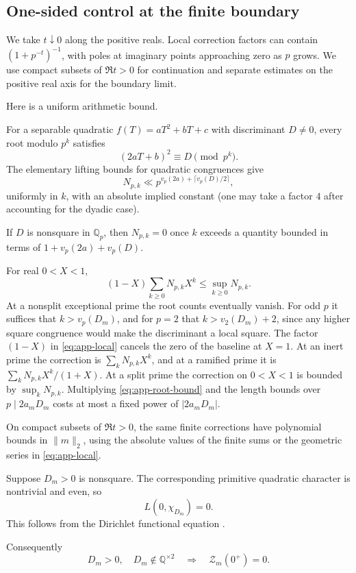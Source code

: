 \documentclass[11pt]{article}
\begin{document}
\subsection{One-sided control at the finite boundary}

We take $t\downarrow0$ along the positive reals. Local correction
factors can contain $(1+p^{-t})^{-1}$, with poles at imaginary points
approaching zero as $p$ grows. We use compact subsets of $\Re t>0$
for continuation and separate estimates on the positive real axis for
the boundary limit.

Here is a uniform arithmetic bound.

For a separable quadratic $f(T)=aT^2+bT+c$
with discriminant $D\ne0$, every root modulo
$p^k$ satisfies
\[
(2aT+b)^2\equiv D\pmod{p^k}.
\]
The elementary lifting bounds for quadratic
congruences give
\begin{equation}\label{eq:app-root-bound}
N_{p,k}\ll
p^{v_p(2a)+\lceil v_p(D)/2\rceil},
\end{equation}
uniformly in $k$, with an absolute implied
constant (one may take a factor $4$ after
accounting for the dyadic case).

If $D$ is nonsquare in $\mathbb Q_p$, then
$N_{p,k}=0$ once $k$ exceeds a quantity bounded
in terms of $1+v_p(2a)+v_p(D)$.

For real $0<X<1$,
\[
(1-X)\sum_{k\ge0}N_{p,k}X^k
\le\sup_{k\ge0}N_{p,k}.
\]
At a nonsplit exceptional prime the root counts eventually vanish.
For odd $p$ it suffices that $k>v_p(D_m)$, and for $p=2$ that
$k>v_2(D_m)+2$, since any higher square congruence would make the
discriminant a local square. The factor $(1-X)$ in
\eqref{eq:app-local} cancels the zero of the baseline at $X=1$.
At an inert prime the correction is $\sum_k N_{p,k}X^k$, and at a
ramified prime it is $\sum_k N_{p,k}X^k/(1+X)$. At a split prime
the correction on $0<X<1$ is bounded by $\sup_k N_{p,k}$.
Multiplying \eqref{eq:app-root-bound} and the length bounds over
$p\mid 2a_mD_m$ costs at most a fixed power of $|2a_mD_m|$.

On compact subsets of $\Re t>0$, the same finite corrections have
polynomial bounds in $\|m\|_2$, using the absolute values of the finite
sums or the geometric series in \eqref{eq:app-local}.

Suppose $D_m>0$ is nonsquare. The corresponding
primitive quadratic character is nontrivial
and even, so
\[
L(0,\chi_{D_m})=0.
\]
This follows from the Dirichlet functional equation \cite{DLMF}.

 Consequently
\begin{equation}\label{eq:app-nonsquare}
\boxed{
D_m>0,\quad D_m\notin\mathbb Q^{\times2}
\quad\Longrightarrow\quad
\mathcal Z_m(0^+)=0.
}
\end{equation}
\end{document}
